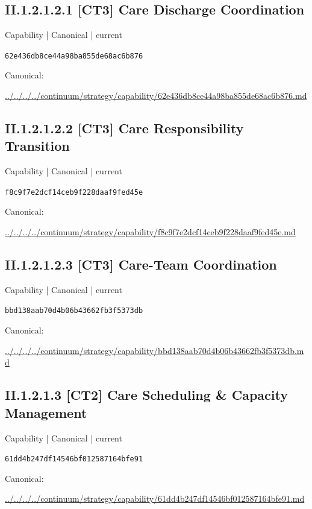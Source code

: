 \documentclass[10pt,a4paper]{article}
\begin{document}
\subsection*{II.1.2.1.2.1 [CT3] Care Discharge Coordination}
\label{element-62e436db8ce44a98ba855de68ac6b876}
{\small Capability | Canonical | current}\par
\texttt{62e436db8ce44a98ba855de68ac6b876}\par
Canonical: \par
{\footnotesize\url{../../../../continuum/strategy/capability/62e436db8ce44a98ba855de68ac6b876.md}}\par
\subsection*{II.1.2.1.2.2 [CT3] Care Responsibility Transition}
\label{element-f8c9f7e2dcf14ceb9f228daaf9fed45e}
{\small Capability | Canonical | current}\par
\texttt{f8c9f7e2dcf14ceb9f228daaf9fed45e}\par
Canonical: \par
{\footnotesize\url{../../../../continuum/strategy/capability/f8c9f7e2dcf14ceb9f228daaf9fed45e.md}}\par
\subsection*{II.1.2.1.2.3 [CT3] Care-Team Coordination}
\label{element-bbd138aab70d4b06b43662fb3f5373db}
{\small Capability | Canonical | current}\par
\texttt{bbd138aab70d4b06b43662fb3f5373db}\par
Canonical: \par
{\footnotesize\url{../../../../continuum/strategy/capability/bbd138aab70d4b06b43662fb3f5373db.md}}\par
\subsection*{II.1.2.1.3 [CT2] Care Scheduling \& Capacity Management}
\label{element-61dd4b247df14546bf012587164bfe91}
{\small Capability | Canonical | current}\par
\texttt{61dd4b247df14546bf012587164bfe91}\par
Canonical: \par
{\footnotesize\url{../../../../continuum/strategy/capability/61dd4b247df14546bf012587164bfe91.md}}\par
\end{document}
